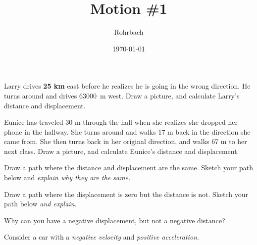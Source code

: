 \documentclass[12pt]{exam}
\title{Motion \#1}
\author{Rohrbach}
\date{\today}
\begin{document}
\maketitle

\begin{questions}
  \question 
    Larry drives {\bf  25 km} east before he realizes he is going in the wrong direction.  He turns around and drives \SI{63000}{\meter} west.  Draw a picture, and calculate Larry's distance and displacement.
    \vs[2]

  \question
    Eunice has traveled 30 m through the hall when she realizes she dropped her phone in the hallway.  She turns around and walks 17 m back in the direction she came from.  She then turns back in her original direction, and walks 67 m to her next class.  Draw a picture, and calculate Eunice's distance and displacement.
    \vs[2]
  
  \question
    Draw a path where the distance and displacement are the same.  Sketch your path below and \emph{explain why they are the same.}
    \vs

  \question
    Draw a path where the displacement is zero but the distance is not.  Sketch your path below \emph{and explain.}
    \vs

  \pagebreak

  \question
    Why can you have a negative displacement, but not a negative distance?
    \vs

  \question
    Consider a car with a \emph{negative velocity} and \emph{positive acceleration}.



\end{questions}
\end{document}
